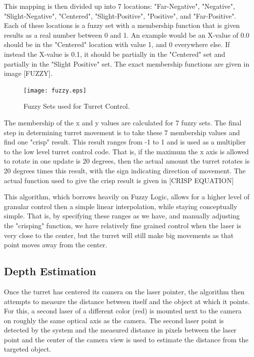 \documentclass[10pt,twocolumn,letterpaper]{article}
\begin{document}
This mapping is then divided up into 7 locations:  "Far-Negative", "Negative", "Slight-Negative", "Centered", "Slight-Positive", "Positive", and "Far-Positive". Each of these locations is a fuzzy set with a membership function that is given results as a real number between 0 and 1. An example would be an X-value of 0.0 should be in the "Centered" location with value 1, and 0 everywhere else. If instead the X-value is 0.1, it should be partially in the "Centered" set and partially in the "Slight Positive" set. The exact membership functions are given in image [FUZZY].

\begin{figure}[t]
\begin{center}
  \texttt{[image: fuzzy.eps]}
\end{center}
   \caption{Fuzzy Sets used for Turret Control.}
\end{figure}

The membership of the x and y values are calculated for 7 fuzzy sets. The final step in determining turret movement is to take these 7 membership values and find one "crisp" result. This result ranges from -1 to 1 and is used as a multiplier to the low level turret control code. That is, if the maximum the x axis is allowed to rotate in one update is 20 degrees, then the actual amount the turret rotates is 20 degrees times this result, with the sign indicating direction of movement. The actual function used to give the crisp result is given in [CRISP EQUATION]

This algorithm, which borrows heavily on Fuzzy Logic, allows for a higher level of granular control then a simple linear interpolation, while staying conceptually simple. That is, by specifying these ranges as we have, and manually adjusting the "crisping" function, we have relatively fine grained control when the laser is very close to the center, but the turret will still make big movements as that point moves away from the center.

\subsection{Depth Estimation}

Once the turret has centered its camera on the laser pointer, the algorithm then attempts to measure the distance between itself and the object at which it points.  For this, a second laser of a different color (red) is mounted next to the camera on roughly the same optical axis as the camera.  The second laser point is detected by the system and the measured distance in pixels between the laser point and the center of the camera view is used to estimate the distance from the targeted object.
\end{document}
